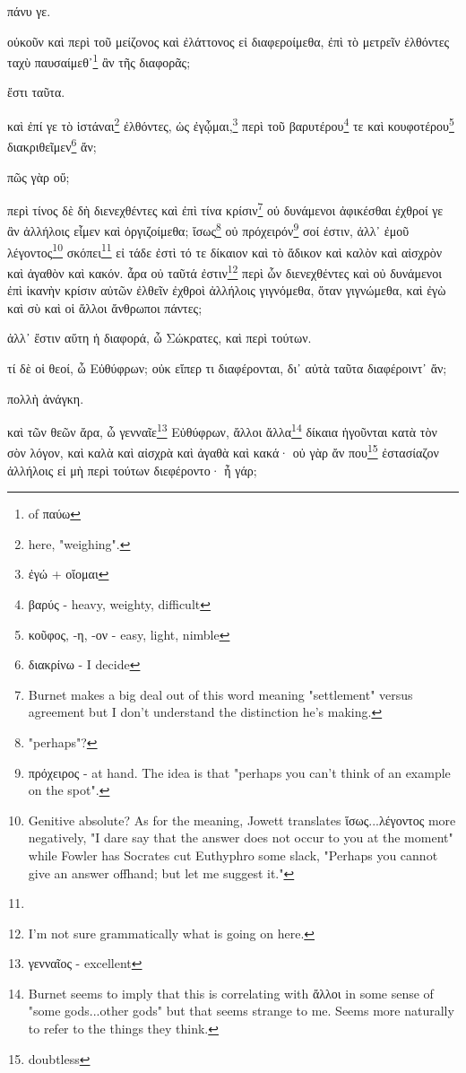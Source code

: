 πάνυ
γε.

οὐκοῦν
καὶ
περὶ
τοῦ
μείζονος
καὶ
ἐλάττονος
εἰ
διαφεροίμεθα,
ἐπὶ
τὸ
μετρεῖν
ἐλθόντες
ταχὺ
παυσαίμεθ᾽\footnote{ of παύω}
ἂν
τῆς
διαφορᾶς;

ἔστι
ταῦτα.

καὶ
ἐπί
γε
τὸ
ἱστάναι\footnote{here, "weighing".}
ἐλθόντες,
ὡς
ἐγᾦμαι,\footnote{ἐγώ + οἴομαι}
περὶ
τοῦ
βαρυτέρου\footnote{βαρύς - heavy, weighty, difficult}
τε
καὶ
κουφοτέρου\footnote{κοῦφος, -η, -ον - easy, light, nimble}
διακριθεῖμεν\footnote{διακρίνω - I decide}
ἄν;

πῶς
γὰρ
οὔ;

περὶ
τίνος
δὲ
δὴ
διενεχθέντες
καὶ
ἐπὶ
τίνα
κρίσιν\footnote{Burnet makes a big deal out of this word meaning "settlement" versus agreement but I don't understand the distinction he's making.}
οὐ
δυνάμενοι
ἀφικέσθαι
ἐχθροί
γε
ἂν
ἀλλήλοις
εἶμεν
καὶ
ὀργιζοίμεθα;
ἴσως\footnote{"perhaps"?}
οὐ
πρόχειρόν\footnote{πρόχειρος - at hand. The idea is that "perhaps you can't think of an example on the spot".}
σοί
ἐστιν,
ἀλλ᾽
ἐμοῦ
λέγοντος\footnote{Genitive absolute? As for the meaning, Jowett translates ἵσως...λέγοντος more negatively, "I dare say that the answer does not occur to you at the moment" while Fowler has Socrates cut Euthyphro some slack, "Perhaps you cannot give an answer offhand; but let me suggest it."}
\versification{[7d]}
σκόπει\footnote{}
εἰ
τάδε
ἐστὶ
τό
τε
δίκαιον
καὶ
τὸ
ἄδικον
καὶ
καλὸν
καὶ
αἰσχρὸν
καὶ
ἀγαθὸν
καὶ
κακόν.
ἆρα
οὐ
ταῦτά
ἐστιν\footnote{I'm not sure grammatically what is going on here.}
περὶ
ὧν
διενεχθέντες
καὶ
οὐ
δυνάμενοι
ἐπὶ
ἱκανὴν
κρίσιν
αὐτῶν
ἐλθεῖν
ἐχθροὶ
ἀλλήλοις
γιγνόμεθα,
ὅταν
γιγνώμεθα,
καὶ
ἐγὼ
καὶ
σὺ
καὶ
οἱ
ἄλλοι
ἄνθρωποι
πάντες;

ἀλλ᾽
ἔστιν
αὕτη
ἡ
διαφορά,
ὦ
Σώκρατες,
καὶ
περὶ
τούτων.

τί
δὲ
οἱ
θεοί,
ὦ
Εὐθύφρων;
οὐκ
εἴπερ
τι
διαφέρονται,
δι᾽
αὐτὰ
ταῦτα
διαφέροιντ᾽
ἄν;

πολλὴ
ἀνάγκη. 

\versification{[7e]}
καὶ
τῶν
θεῶν
ἄρα,
ὦ
γενναῖε\footnote{γενναῖος - excellent}
Εὐθύφρων,
ἄλλοι
ἄλλα\footnote{Burnet seems to imply that this is correlating with ἄλλοι in some sense of "some gods...other gods" but that seems strange to me. Seems more naturally to refer to the things they think.}
δίκαια
ἡγοῦνται
κατὰ
τὸν
σὸν
λόγον,
καὶ
καλὰ
καὶ
αἰσχρὰ
καὶ
ἀγαθὰ
καὶ
κακά·
οὐ
γὰρ
ἄν
που\footnote{doubtless}
ἐστασίαζον
ἀλλήλοις
εἰ
μὴ
περὶ
τούτων
διεφέροντο·
ἦ
γάρ;

